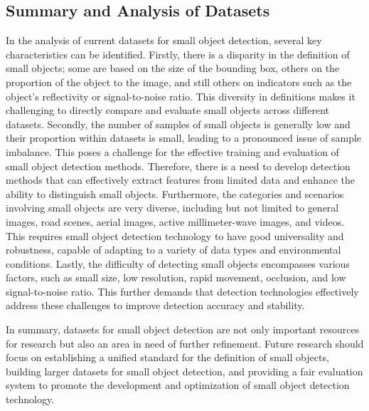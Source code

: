\documentclass[journal]{IEEEtran}
\begin{document}
\subsection{Summary and Analysis of Datasets}

In the analysis of current datasets for small object detection, several key characteristics can be identified. Firstly, there is a disparity in the definition of small objects; some are based on the size of the bounding box, others on the proportion of the object to the image, and still others on indicators such as the object’s reflectivity or signal-to-noise ratio. This diversity in definitions makes it challenging to directly compare and evaluate small objects across different datasets. Secondly, the number of samples of small objects is generally low and their proportion within datasets is small, leading to a pronounced issue of sample imbalance. This poses a challenge for the effective training and evaluation of small object detection methods. Therefore, there is a need to develop detection methods that can effectively extract features from limited data and enhance the ability to distinguish small objects. Furthermore, the categories and scenarios involving small objects are very diverse, including but not limited to general images, road scenes, aerial images, active millimeter-wave images, and videos. This requires small object detection technology to have good universality and robustness, capable of adapting to a variety of data types and environmental conditions. Lastly, the difficulty of detecting small objects encompasses various factors, such as small size, low resolution, rapid movement, occlusion, and low signal-to-noise ratio. This further demands that detection technologies effectively address these challenges to improve detection accuracy and stability.

In summary, datasets for small object detection are not only important resources for research but also an area in need of further refinement. Future research should focus on establishing a unified standard for the definition of small objects, building larger datasets for small object detection, and providing a fair evaluation system to promote the development and optimization of small object detection technology.
\end{document}
